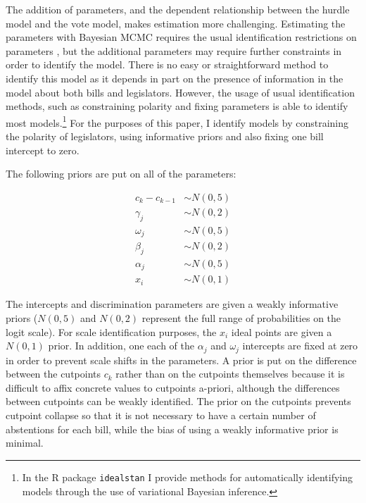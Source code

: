 	The addition of parameters, and the dependent relationship between the hurdle model and the vote model, makes estimation more challenging. Estimating the parameters with Bayesian MCMC requires the usual identification restrictions on parameters \parencite{jackman2004,gelman2005}, but the additional parameters may require further constraints in order to identify the model. There is no easy or straightforward method to identify this model as it depends in part on the presence of information in the model about both bills and legislators. However, the usage of usual identification methods, such as constraining polarity and fixing parameters is able to identify most models.\footnote{In the R package \texttt{idealstan} I provide methods for automatically identifying models through the use of variational Bayesian inference.} For the purposes of this paper, I identify models by constraining the polarity of legislators, using informative priors and also fixing one bill intercept to zero.
	
	The following priors are put on all of the parameters:
	
	\begin{align*}
		c_k - c_{k-1} &\sim N(0,5)\\
		\gamma_j &\sim N(0,2)\\
		\omega_j &\sim N(0,5)\\
		\beta_j &\sim N(0,2)\\
		\alpha_j &\sim N(0,5)\\
		x_i &\sim N(0,1)
	\end{align*}

	
	The intercepts and discrimination parameters are given a weakly informative priors ($N(0,5)$ and $N(0,2)$ represent the full range of probabilities on the logit scale). For scale identification purposes, the $x_i$ ideal points are given a $N(0,1)$ prior. In addition, one each of the $\alpha_j$ and $\omega_j$ intercepts are fixed at zero in order to prevent scale shifts in the parameters. A prior is put on the difference between the cutpoints $c_k$ rather than on the cutpoints themselves because it is difficult to affix concrete values to cutpoints a-priori, although the differences between cutpoints can be weakly identified. The prior on the cutpoints prevents cutpoint collapse so that it is not necessary to have a certain number of abstentions for each bill, while the bias of using a weakly informative prior is minimal.
	
